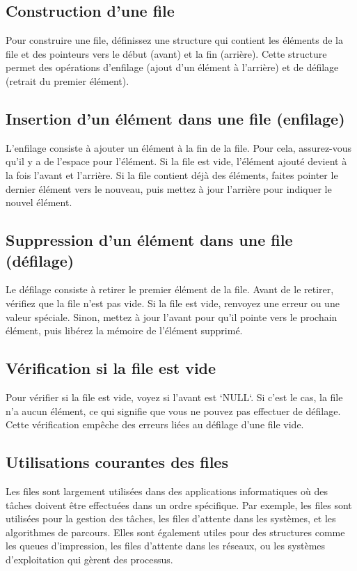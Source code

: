 \subsection{Construction d'une file}
Pour construire une file, définissez une structure qui contient les éléments de la file et des pointeurs vers le début (avant) et la fin (arrière). Cette structure permet des opérations d'enfilage (ajout d'un élément à l'arrière) et de défilage (retrait du premier élément).

\subsection{Insertion d'un élément dans une file (enfilage)}
L'enfilage consiste à ajouter un élément à la fin de la file. Pour cela, assurez-vous qu'il y a de l'espace pour l'élément. Si la file est vide, l'élément ajouté devient à la fois l'avant et l'arrière. Si la file contient déjà des éléments, faites pointer le dernier élément vers le nouveau, puis mettez à jour l'arrière pour indiquer le nouvel élément.

\subsection{Suppression d'un élément dans une file (défilage)}
Le défilage consiste à retirer le premier élément de la file. Avant de le retirer, vérifiez que la file n'est pas vide. Si la file est vide, renvoyez une erreur ou une valeur spéciale. Sinon, mettez à jour l'avant pour qu'il pointe vers le prochain élément, puis libérez la mémoire de l'élément supprimé.

\subsection{Vérification si la file est vide}
Pour vérifier si la file est vide, voyez si l'avant est `NULL`. Si c'est le cas, la file n'a aucun élément, ce qui signifie que vous ne pouvez pas effectuer de défilage. Cette vérification empêche des erreurs liées au défilage d'une file vide.

\subsection{Utilisations courantes des files}
Les files sont largement utilisées dans des applications informatiques où des tâches doivent être effectuées dans un ordre spécifique. Par exemple, les files sont utilisées pour la gestion des tâches, les files d'attente dans les systèmes, et les algorithmes de parcours. Elles sont également utiles pour des structures comme les queues d'impression, les files d'attente dans les réseaux, ou les systèmes d'exploitation qui gèrent des processus.

